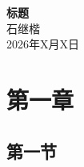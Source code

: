 \documentclass{article}
\begin{document}
	
	\begin{center}
		{\LARGE \textbf{标题}} \\[0.5cm]
		{\large 石继楷 } \\[0.3cm]
		{\large 2026年X月X日}
	\end{center}
	
	\section{第一章}
	
	\subsection{第一节}
	
\end{document}

